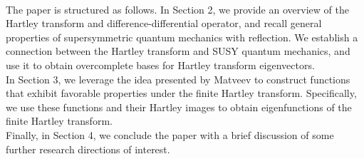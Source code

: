 \documentclass[12 pt]{amsart}
\numberwithin{equation}{section}
\begin{document}
\\
 \indent
The paper is structured as follows. In Section 2, we provide an overview of the Hartley transform and difference-differential operator, and recall general properties of supersymmetric quantum mechanics with reflection. We establish a connection between the Hartley transform and SUSY quantum mechanics, and use it to obtain overcomplete bases for Hartley transform eigenvectors.\\
In Section 3, we leverage the idea presented by Matveev \cite[Theorem 4.1]{Matv} to construct functions that exhibit favorable properties under the finite Hartley transform. Specifically, we use these functions and their Hartley images to obtain eigenfunctions of the finite Hartley transform.\\
Finally, in Section 4, we conclude the paper with a brief discussion of some further research directions of interest.








\end{document}
